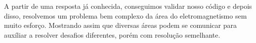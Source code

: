 \documentclass[
12pt,				%
oneside,			%
a4paper,			%
english,			%
french,				%
spanish,			%
brazil				%
]{abntex2}
\begin{document}
A partir de uma resposta já conhecida, conseguimos validar nosso código e depois disso, resolvemos um problema bem complexo da área do eletromagnetismo sem muito esforço. Mostrando assim que diversas áreas podem se comunicar para auxíliar a resolver desafios diferentes, porém com resolução semelhante.

\postextual


%
%
\end{document}
